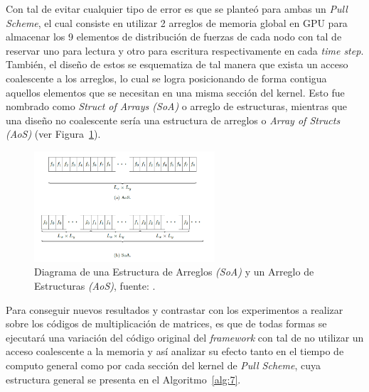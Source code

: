 Con tal de evitar cualquier tipo de error es que se planteó para ambas un \textit{Pull Scheme}, el cual consiste en utilizar 2 arreglos de memoria global en GPU para almacenar los 9 elementos de distribución de fuerzas de cada nodo con tal de reservar uno para lectura y otro para escritura respectivamente en cada \textit{time step}.
También, el diseño de estos se esquematiza de tal manera que exista un acceso coalescente a los arreglos, lo cual se logra posicionando de forma contigua aquellos elementos que se necesitan en una misma sección del kernel.
Esto fue nombrado como \textit{Struct of Arrays (SoA)} o arreglo de estructuras, mientras que una diseño no coalescente sería una estructura de arreglos o \textit{Array of Structs (AoS)} (ver Figura~\ref{fig:15}).

\begin{figure}[h!]
\centering
\includegraphics[width=0.6\textwidth]{Figures/layouts.png}
\caption{Diagrama de una Estructura de Arreglos \textit{(SoA)} y un Arreglo de Estructuras \textit{(AoS)}, fuente: \cite{thesisB}.}
\label{fig:15}
\end{figure}

\newpage


Para conseguir nuevos resultados y contrastar con los experimentos a realizar sobre los códigos de multiplicación de matrices, es que de todas formas se ejecutará una variación del código original del \textit{framework} con tal de no utilizar un acceso coalescente a la memoria y así analizar su efecto tanto en el tiempo de computo general como por cada sección del kernel de \textit{Pull Scheme}, cuya estructura general se presenta en el Algoritmo~\ref{alg:7}.

